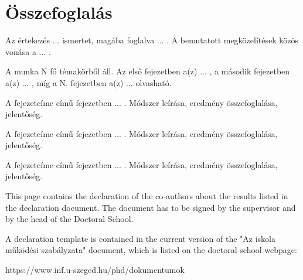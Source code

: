 \documentclass[12pt,a4paper]{extarticle}
\begin{document}
\vspace*{1em}


\renewcommand{\refname}{\large Other References }
 
\makeatletter
\apptocmd{\thebibliography}{\global\c@NAT@ctr 10\relax}{}{}
\makeatother




\newpage

\section{Összefoglalás}

Az értekezés ... ismertet, magába foglalva ... . A bemutatott megközelítések közös vonása a ... .

A munka N fő témakörből áll. Az első fejezetben a(z) ... , a második fejezetben a(z) ... , míg a N. fejezetben a(z) ... olvasható.

A fejezetcíme című fejezetben ... . Módszer leírása, eredmény összefoglalása, jelentőség.

A fejezetcíme című fejezetben ... . Módszer leírása, eredmény összefoglalása, jelentőség.

A fejezetcíme című fejezetben ... . Módszer leírása, eredmény összefoglalása, jelentőség.


\newpage


\newpage

This page contains the declaration of the co-authors about the results listed in the declaration document. The document has to be signed by the supervisor and by the head of the Doctoral School. 

A declaration template is contained in the current version of the "Az iskola működési szabályzata" document, which is listed on the doctoral school webpage:

https://www.inf.u-szeged.hu/phd/dokumentumok


\newpage
\thispagestyle{empty}
\mbox{}
\newpage
\end{document}
